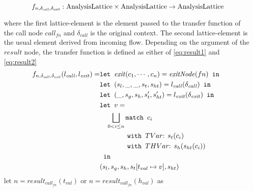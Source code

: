 \begin{equation}
f_{n,\delta_{\mathit{call}},\delta_{\mathit{exit}}}: \text{AnalysisLattice} \times \text{AnalysisLattice} \rightarrow \text{AnalysisLattice}\notag
\end{equation}

where the first lattice-element is the element passed to the transfer function of the call node ${\mathit{call}_{fn}}$ and $\delta_{\mathit{call}}$ is the original context. The second lattice-element is the usual element derived from incoming flow. Depending on the argument of the $\mathit{result}$ node, the transfer function is defined as either of \ref{eq:result1} and \ref{eq:result2}
\begin{align}
f_{n,\delta_{\mathit{call}}, \delta_{\mathit{exit}}}(l_{\mathit{call}}, l_{\mathit{exit}})=   &\texttt{let } \mathit{exit}(c_1, \cdots, c_n) = \mathit{exitNode}(fn) \texttt{ in }\notag\\
                                                &\texttt{let } (s_l, \_, \_, s_t, s_{ht}) = l_{\mathit{call}}(\delta_{\mathit{call}}) \texttt{ in }\notag\\
                                                &\texttt{let } (\_, s_g, s_h, s_t', s_{ht}') = l_{\mathit{exit}}(\delta_{\mathit{exit}}) \texttt{ in }\notag\\
                                                &\texttt{let } v = \notag\\
                                                &\quad \bigsqcup_{0<i \leq n} \texttt{match }c_i\notag\\
                                                &\quad\quad\quad\quad \texttt{with }TVar\text{: } s_t(c_i)\notag\\
                                                &\quad\quad\quad\quad \texttt{with }THVar\text{: } s_h(s_{ht}(c_i))\notag\\
                                                & \texttt{ in }\notag\\
                                                &(s_l,s_g,s_h, s_t[t_{val}\mapsto v], s_{ht}) \label{eq:result1}
\end{align}
let $n = \mathit{result}_{\mathit{call}_{fn}}(t_{val})$ or $n = \mathit{result}_{\mathit{call}_{fn}}(h_{val})$ as 
